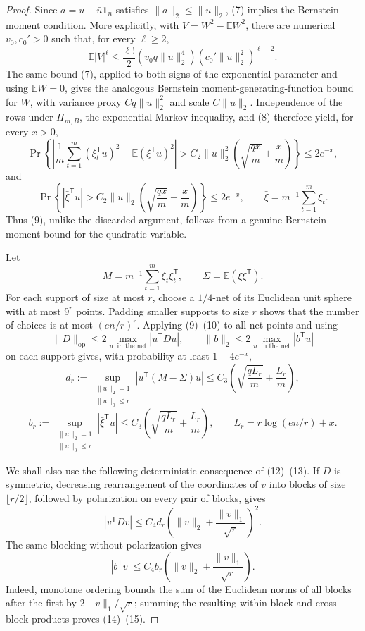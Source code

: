 \documentclass{article}
\begin{document}
\begin{proof}
Since \(a=u-\bar u\mathbf 1_n\) satisfies \(\lVert a\rVert_2\le\lVert u\rVert_2\), (7) implies the Bernstein moment condition.  More explicitly, with \(V=W^2-\mathbb EW^2\), there are numerical \(v_0,c_0'>0\) such that, for every \(\ell\ge2\),
\[
 \mathbb E|V|^\ell
 \le \frac{\ell!}{2}(v_0q\lVert u\rVert_2^4)
       (c_0'\lVert u\rVert_2^2)^{\ell-2}.
 \tag{8}
\]
The same bound (7), applied to both signs of the exponential parameter and using \(\mathbb EW=0\), gives the analogous Bernstein moment-generating-function bound for \(W\), with variance proxy \(Cq\lVert u\rVert_2^2\) and scale \(C\lVert u\rVert_2\).  Independence of the rows under \(\Pi_{m,B}\), the exponential Markov inequality, and (8) therefore yield, for every \(x>0\),
\[
 \Pr\!\left\{
  \left|\frac1m\sum_{t=1}^m(\xi_t^{\mathsf T}u)^2
        -\mathbb E(\xi^{\mathsf T}u)^2\right|
  >C_2\lVert u\rVert_2^2
       \left(\sqrt{\frac{qx}{m}}+\frac{x}{m}\right)
 \right\}\le2e^{-x},
 \tag{9}
\]
and
\[
 \Pr\!\left\{
  |\bar\xi^{\mathsf T}u|>
  C_2\lVert u\rVert_2
       \left(\sqrt{\frac{qx}{m}}+\frac{x}{m}\right)
 \right\}\le2e^{-x},
 \qquad \bar\xi=m^{-1}\sum_{t=1}^m\xi_t.
 \tag{10}
\]
Thus (9), unlike the discarded argument, follows from a genuine Bernstein moment bound for the quadratic variable.

Let
\[
 M=m^{-1}\sum_{t=1}^m\xi_t\xi_t^{\mathsf T},
 \qquad \Sigma=\mathbb E(\xi\xi^{\mathsf T}).
\]
For each support of size at most \(r\), choose a \(1/4\)-net of its Euclidean unit sphere with at most \(9^r\) points.  Padding smaller supports to size \(r\) shows that the number of choices is at most \((en/r)^r\).  Applying (9)--(10) to all net points and using
\[
 \lVert D\rVert_{\mathrm{op}}
 \le2\max_{u\ \text{ in the net}}|u^{\mathsf T}Du|,
 \qquad
 \lVert b\rVert_2
 \le2\max_{u\ \text{ in the net}}|b^{\mathsf T}u|
 \tag{11}
\]
on each support gives, with probability at least \(1-4e^{-x}\),
\[
 d_r:=\sup_{\substack{\lVert u\rVert_2=1\\\lVert u\rVert_0\le r}}
 |u^{\mathsf T}(M-\Sigma)u|
 \le C_3\left(\sqrt{\frac{qL_r}{m}}+\frac{L_r}{m}\right),
 \tag{12}
\]
\[
 b_r:=\sup_{\substack{\lVert u\rVert_2=1\\\lVert u\rVert_0\le r}}
 |\bar\xi^{\mathsf T}u|
 \le C_3\left(\sqrt{\frac{qL_r}{m}}+\frac{L_r}{m}\right),
 \qquad L_r=r\log(en/r)+x.
 \tag{13}
\]

We shall also use the following deterministic consequence of (12)--(13).  If \(D\) is symmetric, decreasing rearrangement of the coordinates of \(v\) into blocks of size \(\lfloor r/2\rfloor\), followed by polarization on every pair of blocks, gives
\[
 |v^{\mathsf T}Dv|
 \le C_4d_r\left(\lVert v\rVert_2+\frac{\lVert v\rVert_1}{\sqrt r}\right)^2.
 \tag{14}
\]
The same blocking without polarization gives
\[
 |b^{\mathsf T}v|
 \le C_4b_r\left(\lVert v\rVert_2+\frac{\lVert v\rVert_1}{\sqrt r}\right).
 \tag{15}
\]
Indeed, monotone ordering bounds the sum of the Euclidean norms of all blocks after the first by \(2\lVert v\rVert_1/\sqrt r\); summing the resulting within-block and cross-block products proves (14)--(15).


\end{proof}
\end{document}
